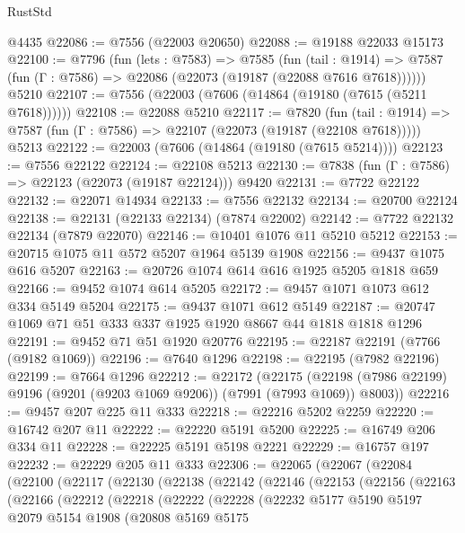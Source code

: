 \begin{lexlean}{RustStd}
\begin{coremodule}
{\begin{coremodule}
{{{{{{{{{{{{{{{{{{{{{{{{{{{{{{{{{{{{{{{{{{{    @4435
@22086 := @7556 (@22003 @20650)
@22088 := @19188 @22033 @15173
@22100 := @7796
    (fun (lets : @7583) =>
    @7585
      (fun (tail : @1914) =>
      @7587 (fun (Γ : @7586) => @22086 (@22073 (@19187 (@22088 @7616 @7618))))))
    @5210
@22107 := @7556 (@22003 (@7606 (@14864 (@19180 (@7615 (@5211 @7618))))))
@22108 := @22088 @5210
@22117 := @7820
    (fun (tail : @1914) => @7587 (fun (Γ : @7586) => @22107 (@22073 (@19187 (@22108 @7618)))))
    @5213
@22122 := @22003 (@7606 (@14864 (@19180 (@7615 @5214))))
@22123 := @7556 @22122
@22124 := @22108 @5213
@22130 := @7838 (fun (Γ : @7586) => @22123 (@22073 (@19187 @22124))) @9420
@22131 := @7722 @22122
@22132 := @22071 @14934
@22133 := @7556 @22132
@22134 := @20700 @22124
@22138 := @22131 (@22133 @22134) (@7874 @22002)
@22142 := @7722 @22132 @22134 (@7879 @22070)
@22146 := @10401 @1076 @11 @5210 @5212
@22153 := @20715 @1075 @11 @572 @5207 @1964 @5139 @1908
@22156 := @9437 @1075 @616 @5207
@22163 := @20726 @1074 @614 @616 @1925 @5205 @1818 @659
@22166 := @9452 @1074 @614 @5205
@22172 := @9457 @1071 @1073 @612 @334 @5149 @5204
@22175 := @9437 @1071 @612 @5149
@22187 := @20747 @1069 @71 @51 @333 @337 @1925 @1920 @8667 @44 @1818 @1818 @1296
@22191 := @9452 @71 @51 @1920 @20776
@22195 := @22187 @22191 (@7766 (@9182 @1069))
@22196 := @7640 @1296
@22198 := @22195 (@7982 @22196)
@22199 := @7664 @1296
@22212 := @22172
    (@22175 (@22198 (@7986 @22199) @9196 (@9201 (@9203 @1069 @9206)) (@7991 (@7993 @1069)) @8003))
@22216 := @9457 @207 @225 @11 @333
@22218 := @22216 @5202 @2259
@22220 := @16742 @207 @11
@22222 := @22220 @5191 @5200
@22225 := @16749 @206 @334 @11
@22228 := @22225 @5191 @5198 @2221
@22229 := @16757 @197
@22232 := @22229 @205 @11 @333
@22306 := @22065
    (@22067
      (@22084
        (@22100
          (@22117
            (@22130
              (@22138
                (@22142
                  (@22146
                    (@22153
                      (@22156
                        (@22163
                          (@22166
                            (@22212
                              (@22218
                                (@22222
                                  (@22228
                                    (@22232
                                      @5177
                                      @5190
                                      @5197
                                      @2079
                                      @5154
                                      @1908
                                      (@20808
                                        @5169
                                        @5175
}}}}}}}}}}}}}}}}}}}}}}}}}}}}}}}}}}}}}}}}}}}
\end{coremodule}}
\end{coremodule}
\end{lexlean}
